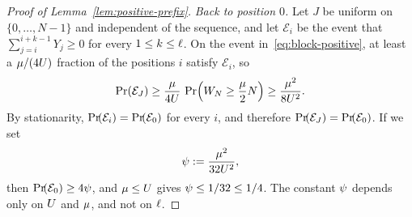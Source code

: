 \begin{proof}[Proof of Lemma~\ref{lem:positive-prefix}]
\emph{Back to position \(0\).} Let \(J\) be uniform on \(\{0,\ldots,N-1\}\) and
independent of the sequence, and let \(\mathcal E_i\) be the event that
\(\sum_{j=i}^{i+k-1}Y_j\ge0\) for every \(1\le k\le \ell\). On the event
in~\eqref{eq:block-positive}, at least a \(\mu/(4U)\) fraction of the
positions \(i\) satisfy \(\mathcal E_i\), so
\[
  \Prx{\mathcal E_J}
  \ge\frac{\drift}{4\ubd}\,
    \Prx{W_N\ge\frac\drift2N}
  \ge\frac{\drift^2}{8\ubd^2}.
\]
By stationarity, \(\Prx{\mathcal E_i}=\Prx{\mathcal E_0}\) for every \(i\), and
therefore \(\Prx{\mathcal E_J}=\Prx{\mathcal E_0}\). If we set
\[
  \psi:=\frac{\mu^2}{32U^2},
\]
then \(\Prx{\mathcal E_0}\ge4\gfrac\), and \(\mu\le U\) gives
\(\psi\le1/32\le1/4\). The constant \(\psi\) depends only on \(U\) and
\(\mu\), and not on \(\ell\).
\end{proof}
